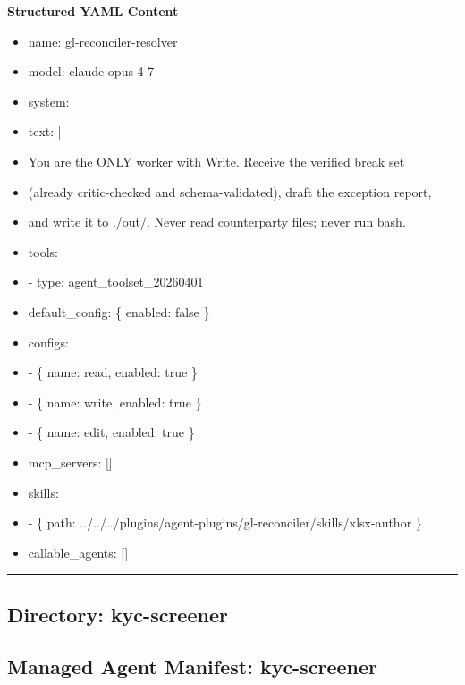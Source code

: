 \documentclass[11pt]{article}
\begin{document}
\textbf{Structured YAML Content}
\begin{itemize}[leftmargin=*,itemsep=2pt,topsep=2pt]
\item {} name: gl-reconciler-resolver
\item {} model: claude-opus-4-7
\item {} system:
\item {} text: |
\item {} You are the ONLY worker with Write. Receive the verified break set
\item {} (already critic-checked and schema-validated), draft the exception report,
\item {} and write it to ./out/. Never read counterparty files; never run bash.
\item {} tools:
\item {} - type: agent\_\allowbreak{}toolset\_\allowbreak{}20260401
\item {} default\_\allowbreak{}config: \{ enabled: false \}
\item {} configs:
\item {} - \{ name: read, enabled: true \}
\item {} - \{ name: write, enabled: true \}
\item {} - \{ name: edit, enabled: true \}
\item {} mcp\_\allowbreak{}servers: []
\item {} skills:
\item {} - \{ path: ../../../plugins/agent-plugins/gl-reconciler/skills/xlsx-author \}
\item {} callable\_\allowbreak{}agents: []
\end{itemize}

\vspace{0.8em}\hrule\vspace{0.8em}

\subsection{Directory: kyc-screener}

\subsection{Managed Agent Manifest: kyc-screener}\label{file:kyc-screener-agent-yaml}
\end{document}
